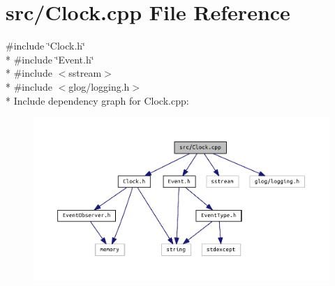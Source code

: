 \section{src/\+Clock.cpp File Reference}
\label{_clock_8cpp}
{\ttfamily \#include \char`\"{}Clock.\+h\char`\"{}}\\*
{\ttfamily \#include \char`\"{}Event.\+h\char`\"{}}\\*
{\ttfamily \#include $<$sstream$>$}\\*
{\ttfamily \#include $<$glog/logging.\+h$>$}\\*
Include dependency graph for Clock.\+cpp\+:
\nopagebreak
\begin{figure}[H]
\begin{center}
\leavevmode
\includegraphics[width=350pt]{_clock_8cpp__incl}
\end{center}
\end{figure}
